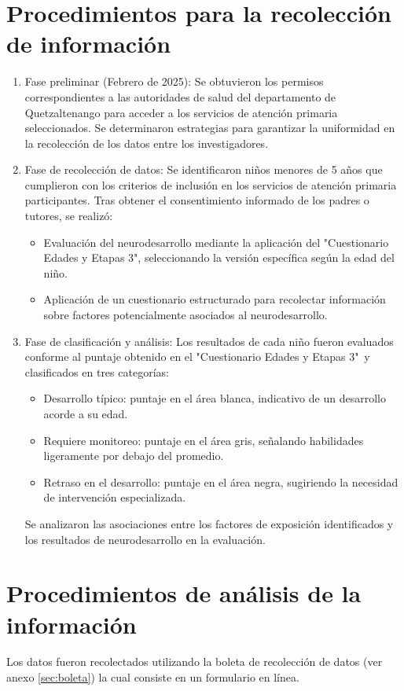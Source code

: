 \documentclass[11pt,letterpaper]{report}
\newcommand{\asq}{"Cuestionario Edades y Etapas 3"}
\begin{document}
\section{Procedimientos para la recolección de información}
	\begin{enumerate}
		\item Fase preliminar (Febrero de 2025):
		Se obtuvieron los permisos correspondientes a las autoridades de salud
		del departamento de Quetzaltenango para acceder a los servicios de
		atención primaria seleccionados. Se determinaron estrategias para
		garantizar la uniformidad en la recolección de los datos entre los
		investigadores.
		\item Fase de recolección de datos:
		Se identificaron niños menores de 5 años que cumplieron con los
		criterios de inclusión en los servicios de atención primaria
		participantes. Tras obtener el consentimiento informado de los padres o
		tutores, se realizó:
			\begin{itemize}
			\item Evaluación del neurodesarrollo mediante la aplicación del
			\asq, seleccionando la versión específica según la edad del niño.
			\item Aplicación de un cuestionario estructurado para recolectar
			información sobre factores potencialmente asociados al
			neurodesarrollo.
			\end{itemize}
		\item Fase de clasificación y análisis:
		Los resultados de cada niño fueron evaluados conforme al puntaje
		obtenido en el \asq\ y clasificados en tres categorías:
			\begin{itemize}
			\item Desarrollo típico: puntaje en el área blanca, indicativo de
			un desarrollo acorde a su edad.
			\item Requiere monitoreo: puntaje en el área gris, señalando
			habilidades ligeramente por debajo del promedio.
			\item Retraso en el desarrollo: puntaje en el área negra,
			sugiriendo la necesidad de intervención especializada.
			\end{itemize}
		Se analizaron las asociaciones entre los factores de exposición
		identificados y los resultados de neurodesarrollo en la evaluación.
	\end{enumerate}

\section{Procedimientos de análisis de la información}
Los datos fueron recolectados utilizando la boleta de recolección de datos (ver
anexo \ref{sec:boleta}) la cual consiste en un formulario en línea.
\end{document}
